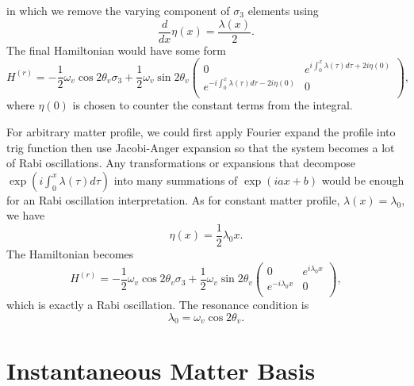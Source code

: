 in which we remove the varying component of $\sigma_3$ elements using
\begin{equation}
    \frac{d}{dx}\eta(x) = \frac{\lambda(x)}{2}.
\end{equation}
The final Hamiltonian would have some form
\begin{equation}
     H^{(r)} = - \frac{1}{2}\omega_v \cos 2\theta_v \sigma_3 + \frac{1}{2} \omega_v \sin 2\theta_v \begin{pmatrix}
   0 & e^{i\int_0^x \lambda(\tau)d\tau + 2i\eta(0)} \\
   e^{-i\int_0^x \lambda(\tau)d\tau - 2i\eta(0)} & 0 \\
   \end{pmatrix},
\end{equation}
where $\eta(0)$ is chosen to counter the constant terms from the integral.

For arbitrary matter profile, we could first apply Fourier expand the profile into trig function then use Jacobi-Anger expansion so that the system becomes a lot of Rabi oscillations.
Any transformations or expansions that decompose $\exp{\left(i\int_0^x \lambda(\tau)d\tau\right)}$ into many summations of $\exp{\left( i a x + b \right)}$ would be enough for an Rabi oscillation interpretation.
As for constant matter profile, $\lambda(x) = \lambda_0$, we have
\begin{equation}
     \eta(x) = \frac{1}{2} \lambda_0 x.
\end{equation}
The Hamiltonian becomes
\begin{equation}
     H^{(r)} = - \frac{1}{2}\omega_v \cos 2\theta_v \sigma_3 + \frac{1}{2} \omega_v \sin 2\theta_v \begin{pmatrix}
   0 & e^{i\lambda_0 x} \\
   e^{-i\lambda_0 x} & 0 \\
   \end{pmatrix},
\end{equation}
which is exactly a Rabi oscillation. The resonance condition is
\begin{equation}
   \lambda_0 = \omega_v \cos 2\theta_v. 
\end{equation}
   




\section{Instantaneous Matter Basis}


